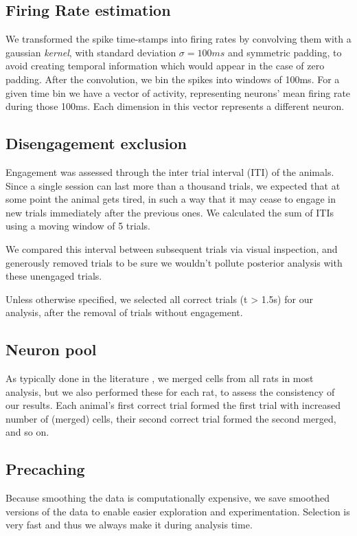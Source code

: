 \subsection{Firing Rate estimation}
    We transformed the spike time-stamps into firing rates by convolving them with a gaussian \textit{kernel}, with standard deviation $\sigma = 100ms$ and symmetric padding, to avoid creating temporal information which would appear in the case of zero padding. After the convolution, we bin the spikes into windows of 100ms. For a given time bin we have a vector of activity, representing neurons' mean firing rate during those 100ms. Each dimension in this vector represents a different neuron.
    

\subsection{Disengagement exclusion}
    Engagement was assessed through the inter trial interval (ITI) of the animals. Since a single session can last more than a thousand trials, we expected that at some point the animal gets tired, in such a way that it may cease to engage in new trials immediately after the previous ones. We calculated the sum of ITIs using a moving window of 5 trials. 
    
    We compared this interval between subsequent trials via visual inspection, and generously removed trials to be sure we wouldn't pollute posterior analysis with these unengaged trials.
    
    Unless otherwise specified, we selected all correct trials (t > 1.5s) for our analysis, after the removal of trials without engagement. 
    
\subsection{Neuron pool}
    As typically done in the literature \cite{}, we merged cells from all rats in most analysis, but we also performed these for each rat, to assess the consistency of our results. Each animal's first correct trial formed the first trial with increased number of (merged) cells, their second correct trial formed the second merged, and so on.
    
\subsection{Precaching}
    Because smoothing the data is computationally expensive, we save smoothed versions of the data to enable easier exploration and experimentation. Selection is very fast and thus we always make it during analysis time.
